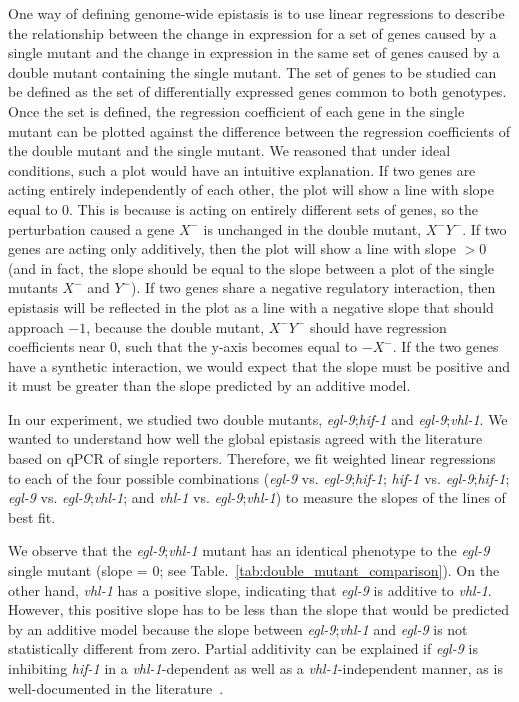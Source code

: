 \documentclass[9pt,twocolumn,twoside]{pnas-new}
\newcommand{\egl}{\emph{egl-9}}
\newcommand{\vhl}{\emph{vhl-1}}
\newcommand{\hif}{\emph{hif-1}}
\begin{document}
One way of defining genome-wide epistasis is to use linear regressions to describe
the relationship between the change in expression for a set of genes caused by a
single mutant and the change in expression in the same set of genes caused by a
double mutant containing the single mutant. The set of genes
to be studied can be defined as the set of differentially expressed genes common
to both genotypes.
Once the set is defined, the regression coefficient of each gene in the single
mutant can be plotted against the difference between the regression coefficients of
the double mutant and the single mutant. We reasoned that under ideal conditions,
such a plot would have an intuitive explanation. If two genes are acting
entirely independently of each other, the plot will show a line with slope equal
to 0. This is because is acting on entirely different sets of genes, so the
perturbation caused a gene $X^-$ is unchanged in the double mutant, $X^-Y^-$. If
two genes are acting only additively, then the plot will show a line with
slope $>0$ (and in fact, the slope should be equal to the slope between a plot of
the single mutants $X^-$ and $Y^-$). If two genes share a negative regulatory interaction,
then epistasis will be reflected in the plot as a line with a negative slope that
should approach $-1$, because
the double mutant, $X^-Y^-$ should have regression coefficients near 0, such that
the y-axis becomes equal to $-X^-$. If the two genes have a synthetic interaction,
we would expect that the slope must be positive and it must be greater than the
slope predicted by an additive model.

In our experiment, we studied two double mutants, \egl{};\hif{} and \egl{};\vhl{}.
We wanted to understand how well the global epistasis agreed with the literature
based on qPCR of single reporters. Therefore, we fit weighted linear regressions
to each of the four possible combinations (\egl{} vs. \egl{};\hif{};
\hif{} vs. \egl{};\hif{}; \egl{} vs. \egl{};\vhl{}; and \vhl{} vs. \egl{};\vhl{})
to measure the slopes of the lines of best fit.

We observe that the \egl{};\vhl{} mutant has an identical phenotype to the
\egl{} single mutant (slope = 0; see Table.~\ref{tab:double_mutant_comparison}).
On the other hand, \vhl{} has a positive slope, indicating that \egl{} is
additive to \vhl{}. However, this positive slope has to be less than the slope that
would be predicted by an additive model because the slope between \egl{};\vhl{} and
\egl{} is not statistically different from zero. Partial additivity can be explained
if \egl{} is inhibiting \hif{} in a \vhl{}-dependent as well as a \vhl{}-independent
manner, as is well-documented in the literature~\cite{Shao2009}.
\end{document}
